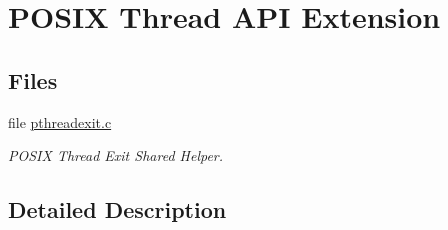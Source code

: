 \hypertarget{group__POSIX__THREAD}{}\section{P\+O\+S\+IX Thread A\+PI Extension}
\label{group__POSIX__THREAD}
\subsection*{Files}
\begin{DoxyCompactItemize}
\item 
file \mbox{\hyperlink{pthreadexit_8c}{pthreadexit.\+c}}
\begin{DoxyCompactList}\small\item\em P\+O\+S\+IX Thread Exit Shared Helper. \end{DoxyCompactList}\end{DoxyCompactItemize}


\subsection{Detailed Description}
